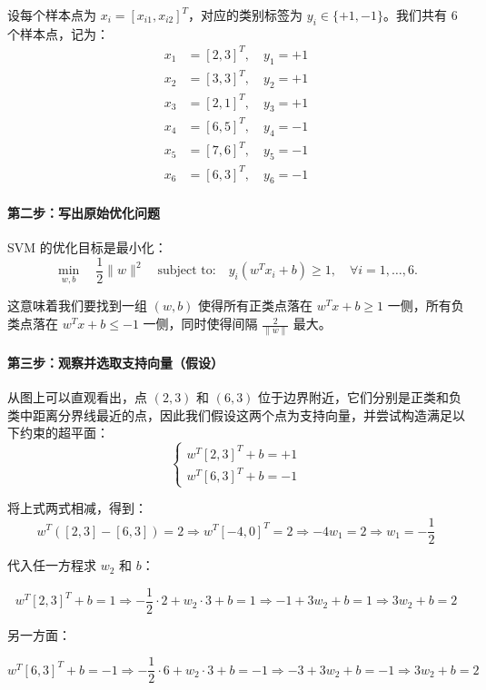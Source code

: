 设每个样本点为 $x_i = [x_{i1}, x_{i2}]^T$，对应的类别标签为 $y_i \in \{+1, -1\}$。我们共有 6 个样本点，记为：
\[
\begin{aligned}
x_1 &= [2, 3]^T,\quad y_1 = +1 \\
x_2 &= [3, 3]^T,\quad y_2 = +1 \\
x_3 &= [2, 1]^T,\quad y_3 = +1 \\
x_4 &= [6, 5]^T,\quad y_4 = -1 \\
x_5 &= [7, 6]^T,\quad y_5 = -1 \\
x_6 &= [6, 3]^T,\quad y_6 = -1
\end{aligned}
\]

\vspace{0.5em}
\paragraph{第二步：写出原始优化问题}

SVM 的优化目标是最小化：
\[
\min_{w, b} \quad \frac{1}{2}\|w\|^2
\quad \text{subject to:} \quad y_i(w^T x_i + b) \geq 1,\quad \forall i = 1,\dots,6.
\]

这意味着我们要找到一组 $(w, b)$ 使得所有正类点落在 $w^T x + b \geq 1$ 一侧，所有负类点落在 $w^T x + b \leq -1$ 一侧，同时使得间隔 $\frac{2}{\|w\|}$ 最大。

\vspace{0.5em}
\paragraph{第三步：观察并选取支持向量（假设）}

从图上可以直观看出，点 $(2, 3)$ 和 $(6, 3)$ 位于边界附近，它们分别是正类和负类中距离分界线最近的点，因此我们假设这两个点为支持向量，并尝试构造满足以下约束的超平面：
\[
\begin{cases}
w^T[2,3]^T + b = +1 \\
w^T[6,3]^T + b = -1
\end{cases}
\]

将上式两式相减，得到：
\[
w^T([2,3] - [6,3]) = 2 \Rightarrow w^T[-4, 0]^T = 2 \Rightarrow -4w_1 = 2 \Rightarrow w_1 = -\frac{1}{2}
\]

代入任一方程求 $w_2$ 和 $b$：

\[
w^T [2, 3]^T + b = 1 \Rightarrow -\frac{1}{2}\cdot 2 + w_2 \cdot 3 + b = 1
\Rightarrow -1 + 3w_2 + b = 1
\Rightarrow 3w_2 + b = 2
\]

另一方面：

\[
w^T [6, 3]^T + b = -1 \Rightarrow -\frac{1}{2}\cdot 6 + w_2 \cdot 3 + b = -1
\Rightarrow -3 + 3w_2 + b = -1
\Rightarrow 3w_2 + b = 2
\]

